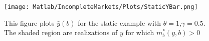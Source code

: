 \documentclass[12pt]{article}
\begin{document}
	\begin{figure}[htbp]
\centering
	  \texttt{[image: Matlab/IncompleteMarkets/Plots/StaticYBar.png]}

	\caption{This figure plots $\bar{y} (b)$ for the static example with $\theta=1$,$\gamma=0.5$. The shaded region are realizations of $y$ for which $m^*_b(y,b)>0$}
	\label{fig:StaticYBar}
\end{figure} 

%
%
%
%
\end{document}
